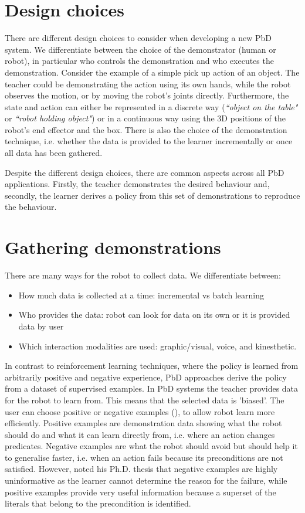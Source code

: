 \section{Design choices}\label{subsec:Design choices}
There are different design choices to consider when developing a new PbD system.
We differentiate between the choice of the demonstrator (human or robot), in particular who controls the demonstration and who executes the demonstration.
 Consider the example of a simple pick up action of an object.
 The teacher could be demonstrating the action using its own hands, while the robot observes the motion, or by moving the robot's joints directly.
 Furthermore, the state and action can either be represented in a discrete way (\textit{``object on the table"} or \textit{``robot holding object"}) or in a continuous way using the 3D positions of the robot's end effector and the box.
 There is also the choice of the demonstration technique, i.e. whether the data is provided to the learner incrementally or once all data has been gathered.
 
Despite the different design choices, there are common aspects across all PbD applications. Firstly, the teacher demonstrates the desired behaviour and, secondly, the learner derives a policy from this set of demonstrations to reproduce the behaviour.

\section{Gathering demonstrations} \label{subsec:Gathering demonstrations}
There are many ways for the robot to collect data.
 We differentiate between:
\begin{itemize}
    \item How much data is collected at a time: incremental vs batch learning
    \item Who provides the data: robot can look for data on its own or it is provided data by user
    \item Which interaction modalities are used: graphic/visual, voice, and kinesthetic. 
\end{itemize}

In contrast to reinforcement learning techniques, where the policy is learned from arbitrarily positive and negative experience, PbD approaches derive the policy from a dataset of supervised examples.
In PbD systems the teacher provides data for the robot to learn from.
This means that the selected data is 'biased'. 
The user can choose positive or negative examples (\cite{grollman2012robot}), to allow robot learn more efficiently.
Positive examples are demonstration data showing what the robot should do and what it can learn directly from, i.e. where an action changes predicates.
Negative examples are what the robot should avoid but should help it to generalise faster, i.e. when an action fails because its preconditions are not satisfied.
However, \cite{walsh2010efficient} noted his Ph.D. thesis that negative examples are highly uninformative as the learner cannot determine the reason for the failure, while positive examples provide very useful information because a superset of the literals that belong to the precondition is identified.

